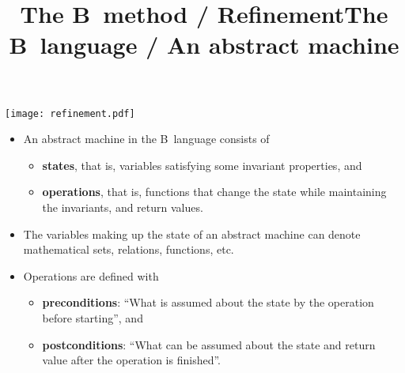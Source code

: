 \documentclass[wide]{slides}
\begin{document}
\begin{slide}
  \title{The B~method / Refinement}

  \begin{center}
    \texttt{[image: refinement.pdf]}
  \end{center}

\end{slide}

\begin{slide}
  \title{The B~language / An abstract machine}

  \begin{itemize}

    \item An abstract machine in the B~language consists of
      \begin{itemize}

        \item \textbf{states}, that is, variables satisfying some
          invariant properties, and

        \item \textbf{operations}, that is, functions that change the
          state while maintaining the invariants, and return values.

      \end{itemize}

    \item The variables making up the state of an abstract machine can
      denote mathematical sets, relations, functions, etc.

    \item Operations are defined with
      \begin{itemize}

        \item \textbf{preconditions}: ``What is assumed about the
          state by the operation before starting'', and

        \item \textbf{postconditions}: ``What can be assumed about the
          state and return value after the operation is finished''.

      \end{itemize}

  \end{itemize}

\end{slide}
\end{document}
